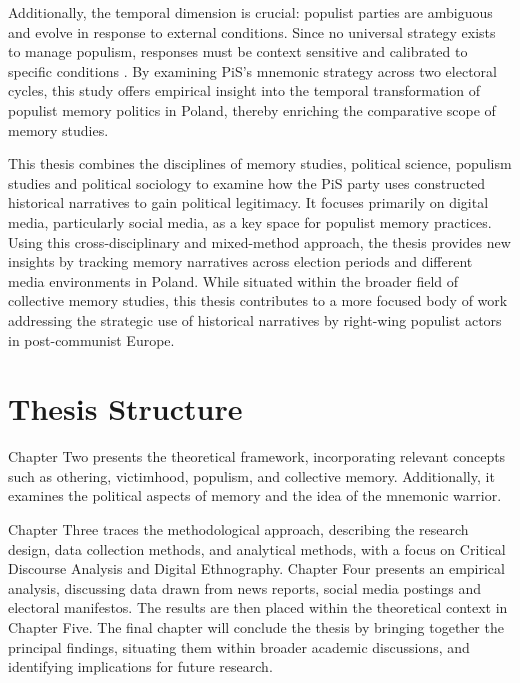 Additionally, the temporal dimension is crucial: populist parties are ambiguous and evolve in response to external conditions. Since no universal strategy exists to manage populism, responses must be context sensitive and calibrated to specific conditions \citep{crum_populist_2022}. By examining PiS's mnemonic strategy across two electoral cycles, this study offers empirical insight into the temporal transformation of populist memory politics in Poland, thereby enriching the comparative scope of memory studies.

This thesis combines the disciplines of memory studies, political science, populism studies and political sociology to examine how the PiS party uses constructed historical narratives to gain political legitimacy. It focuses primarily on digital media, particularly social media, as a key space for populist memory practices. Using this cross-disciplinary and mixed-method approach, the thesis provides new insights by tracking memory narratives across election periods and different media environments in Poland. While situated within the broader field of collective memory studies, this thesis contributes to a more focused body of work addressing the strategic use of historical narratives by right-wing populist actors in post-communist Europe.

\section{Thesis Structure}

Chapter Two presents the theoretical framework, incorporating relevant concepts such as othering, victimhood, populism, and collective memory. Additionally, it examines the political aspects of memory and the idea of the mnemonic warrior.

Chapter Three traces the methodological approach, describing the research design, data collection methods, and analytical methods, with a focus on Critical Discourse Analysis and Digital Ethnography. 
Chapter Four presents an empirical analysis, discussing data drawn from news reports, social media postings and electoral manifestos. The results are then placed within the theoretical context in Chapter Five. The final chapter will conclude the thesis by bringing together the principal findings, situating them within broader academic discussions, and identifying implications for future research.
